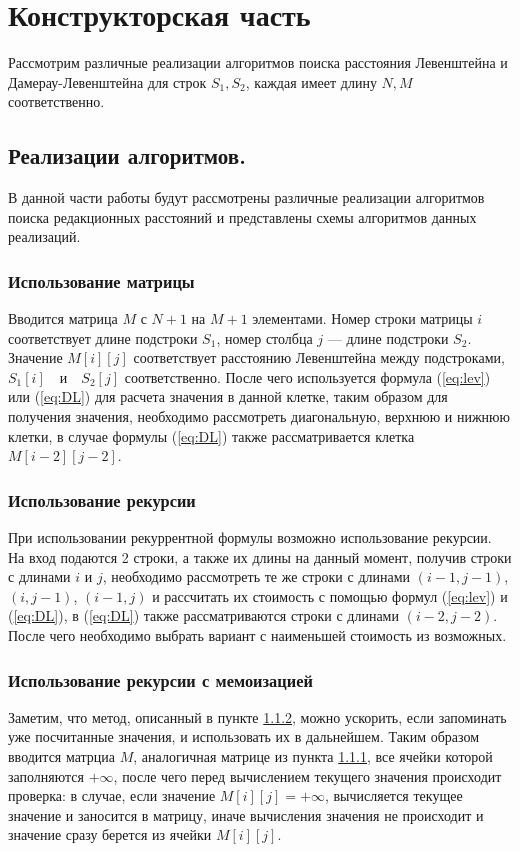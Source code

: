 \chapter{Конструкторская часть}

Рассмотрим различные реализации алгоритмов поиска расстояния Левенштейна и Дамерау-Левенштейна для строк $S_{1},S_{2}$, каждая имеет
длину $N , M$ соответственно.


\section{Реализации алгоритмов.}
В данной части работы будут рассмотрены различные реализации
алгоритмов поиска редакционных расстояний и представлены схемы алгоритмов данных реализаций.

\subsection{Использование матрицы}
\label{subsec:matrix_math_desc}
Вводится матрица $M$ с $N + 1$ на $M + 1$ элементами. Номер строки матрицы $i$ соответствует длине подстроки $S_{1}$, номер столбца $j$ --- длине подстроки $S_{2}$.
Значение $M[i][j]$ соответствует расстоянию Левенштейна между подстроками, $S_{1}[i] \quad \text{и} \quad S_{2}[j]$ соответственно. После чего используется формула (\ref{eq:lev}) или
(\ref{eq:DL}) для расчета значения в данной клетке, таким образом для получения значения, необходимо рассмотреть диагональную, верхнюю и нижнюю клетки, в случае формулы (\ref{eq:DL}) также рассматривается клетка $M[i-2][j-2]$.


\subsection{Использование рекурсии}
\label{subsec:recurse_math_desc}
При использовании рекуррентной формулы возможно использование рекурсии.
На вход подаются 2 строки, а также их длины на данный момент, получив строки с длинами $i$ и $j$, необходимо рассмотреть 
те же строки с длинами $(i-1,j-1)$, $(i,j-1)$, $(i-1,j)$ и рассчитать их стоимость  с помощью формул (\ref{eq:lev}) и (\ref{eq:DL}), в (\ref{eq:DL}) также рассматриваются строки с длинами $(i-2,j-2)$. 
После чего необходимо выбрать вариант с наименьшей стоимость из возможных.

\subsection{Использование рекурсии с мемоизацией}
\label{subec:memorysation_descr}
Заметим, что метод, описанный в пункте \ref{subsec:recurse_math_desc}, можно ускорить, если запоминать уже посчитанные значения, и использовать их в дальнейшем.
Таким образом вводится матрциа $M$, аналогичная матрице из пункта \ref{subsec:matrix_math_desc}, все ячейки которой заполняются $+\infty$, после чего
перед вычислением текущего значения происходит проверка: в случае, если значение $M[i][j] = +\infty$, вычисляется текущее значение и заносится в матрицу, иначе
вычисления значения не происходит и значение сразу берется из ячейки $M[i][j]$.

